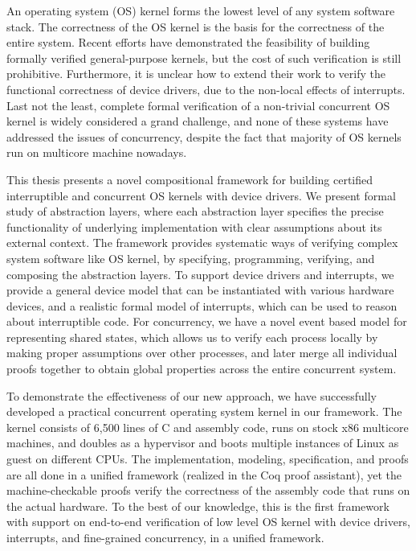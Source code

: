 An operating system (OS) kernel forms the lowest level of any system
software stack. The correctness of the OS kernel is the basis for the
correctness of the entire system. Recent efforts have demonstrated the
feasibility of building formally verified general-purpose kernels, but
the cost of such verification is still prohibitive. Furthermore,
it is unclear how to extend their work to verify the functional
correctness of device drivers, due to the non-local effects of
interrupts. Last not the least,  
complete formal verification of a non-trivial concurrent
OS kernel is widely considered a grand challenge, and
none of these systems have addressed
the issues of concurrency, despite the fact that majority
of OS kernels run on multicore machine nowadays.

This thesis presents a novel compositional framework
for building certified interruptible and concurrent OS kernels with device
drivers. We present formal study of abstraction layers, where
each abstraction layer specifies the precise functionality
of underlying implementation with clear assumptions about its
external context. The framework provides
systematic ways of verifying complex system software like OS kernel,
by specifying, programming, verifying, and composing the abstraction
layers. To support device drivers and interrupts,
we provide a general device model that can be instantiated
with various hardware devices, and a realistic formal model of
interrupts, which can be used to reason about interruptible code. 
For concurrency, we have a novel event based model for representing
shared states,
which allows us to verify each process locally by 
making proper assumptions over other processes, and later
merge all individual proofs together to obtain global properties
across the entire concurrent system.

To demonstrate the effectiveness of our new approach, we have
successfully developed a practical concurrent operating system
kernel in our framework.
The kernel consists of 6,500 lines of C and assembly code, runs on stock
x86 multicore machines, and doubles as a hypervisor and boots multiple instances
of Linux as guest on different CPUs. 
The implementation, modeling, specification, and
  proofs are all done in a unified framework (realized in the Coq
  proof assistant), yet the machine-checkable proofs verify the
  correctness of the assembly code that runs on the actual
  hardware.
To the best of our knowledge, this is the first framework with support
on end-to-end verification of low level OS kernel with device drivers,
interrupts, and fine-grained concurrency, in a unified framework.
